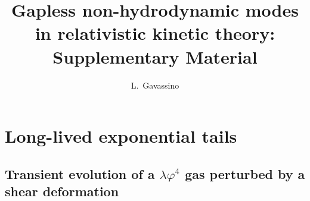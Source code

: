 \documentclass[a4paper, amsfonts, amssymb, amsmath, reprint, showkeys, nofootinbib, twoside, onecolumn,notitlepage,,longbibliography]{revtex4-2}
\theoremstyle{definition}
\theoremstyle{theorem}
\theoremstyle{corollary}
\begin{document}
\setcounter{equation}{0}
\setcounter{figure}{0}
\setcounter{table}{0}
\setcounter{page}{1}
\renewcommand{\theequation}{S\arabic{equation}}
\renewcommand{\thefigure}{S\arabic{figure}}


\title{Gapless non-hydrodynamic modes in relativistic kinetic theory: Supplementary Material}
\author{L.~Gavassino}




\vspace{-1cm}
\section{Long-lived exponential tails}
\vspace{-0.2cm}

\subsection{Transient evolution of a $\lambda \varphi^4$ gas perturbed by a shear deformation}
\vspace{-0.2cm}
\end{document}
